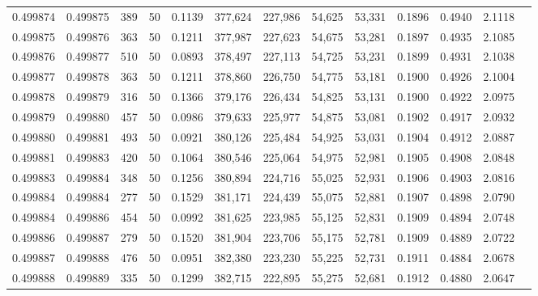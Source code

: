 \begin{tabular}{rrrrrrrrrrrrr}
0.499874 & 0.499875 & 389 &  50 &                                     0.1139 & 377,624 & 227,986 &  54,625 &  53,331 & 0.1896 & 0.4940 & 2.1118 \\
0.499875 & 0.499876 & 363 &  50 &                                     0.1211 & 377,987 & 227,623 &  54,675 &  53,281 & 0.1897 & 0.4935 & 2.1085 \\
0.499876 & 0.499877 & 510 &  50 &                                     0.0893 & 378,497 & 227,113 &  54,725 &  53,231 & 0.1899 & 0.4931 & 2.1038 \\
0.499877 & 0.499878 & 363 &  50 &                                     0.1211 & 378,860 & 226,750 &  54,775 &  53,181 & 0.1900 & 0.4926 & 2.1004 \\
0.499878 & 0.499879 & 316 &  50 &                                     0.1366 & 379,176 & 226,434 &  54,825 &  53,131 & 0.1900 & 0.4922 & 2.0975 \\
0.499879 & 0.499880 & 457 &  50 &                                     0.0986 & 379,633 & 225,977 &  54,875 &  53,081 & 0.1902 & 0.4917 & 2.0932 \\
0.499880 & 0.499881 & 493 &  50 &                                     0.0921 & 380,126 & 225,484 &  54,925 &  53,031 & 0.1904 & 0.4912 & 2.0887 \\
0.499881 & 0.499883 & 420 &  50 &                                     0.1064 & 380,546 & 225,064 &  54,975 &  52,981 & 0.1905 & 0.4908 & 2.0848 \\
0.499883 & 0.499884 & 348 &  50 &                                     0.1256 & 380,894 & 224,716 &  55,025 &  52,931 & 0.1906 & 0.4903 & 2.0816 \\
0.499884 & 0.499884 & 277 &  50 &                                     0.1529 & 381,171 & 224,439 &  55,075 &  52,881 & 0.1907 & 0.4898 & 2.0790 \\
0.499884 & 0.499886 & 454 &  50 &                                     0.0992 & 381,625 & 223,985 &  55,125 &  52,831 & 0.1909 & 0.4894 & 2.0748 \\
0.499886 & 0.499887 & 279 &  50 &                                     0.1520 & 381,904 & 223,706 &  55,175 &  52,781 & 0.1909 & 0.4889 & 2.0722 \\
0.499887 & 0.499888 & 476 &  50 &                                     0.0951 & 382,380 & 223,230 &  55,225 &  52,731 & 0.1911 & 0.4884 & 2.0678 \\
0.499888 & 0.499889 & 335 &  50 &                                     0.1299 & 382,715 & 222,895 &  55,275 &  52,681 & 0.1912 & 0.4880 & 2.0647 \\

\end{tabular}
